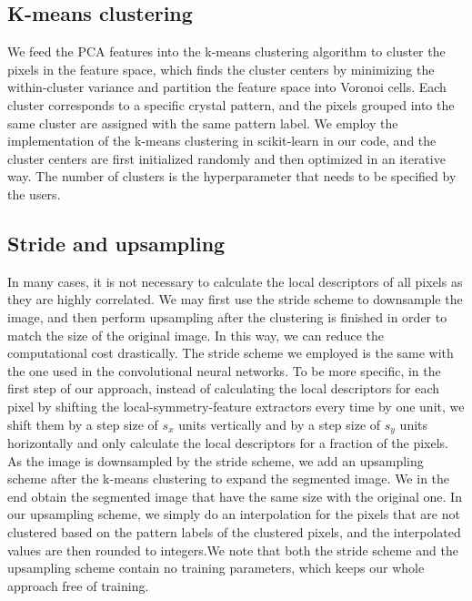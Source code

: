 \documentclass[twocolumn,amsmath, floatfix]{revtex4}
\begin{document}
\subsection{K-means clustering}
We feed the PCA features into the k-means clustering algorithm \cite{kmeans1967, kmeans2007} to cluster the pixels in the feature space, which finds the cluster centers by minimizing the within-cluster variance and partition the feature space into Voronoi cells.  Each cluster corresponds to a specific crystal pattern, and the pixels grouped into the same cluster are assigned with the same pattern label.  We employ the implementation of the k-means clustering in scikit-learn \cite{scikit-learn} in our code, and the cluster centers are first initialized randomly and then optimized in an iterative way. The number of clusters is the hyperparameter that needs to be specified by the users. 

\subsection{Stride and upsampling}
In many cases, it is not necessary to calculate the local descriptors of all pixels as they are highly correlated. We may first use the stride scheme to downsample the image, and then perform upsampling after the clustering is finished in order to match the size of the original image. In this way, we can reduce the computational cost drastically.  The stride scheme we employed is the same with the one used in the convolutional neural networks. To be more specific,  in the first step of our approach,
instead of calculating the local descriptors for each pixel by shifting the local-symmetry-feature extractors every time by one unit, we shift them by a step size of $s_x$ units vertically and by a step size of $s_y$ units horizontally and only calculate the local descriptors for a fraction of the pixels. As the image is downsampled by the stride scheme, we add an upsampling scheme after the k-means clustering to expand the segmented image. We in the end obtain the segmented image that have the same size with the original one. In our upsampling scheme, we simply do an interpolation for the pixels that are not clustered based on the pattern labels of the clustered pixels, and the interpolated values are then rounded to integers.We note that both the stride scheme and the upsampling scheme contain no training parameters, which keeps our whole approach free of training.  
\end{document}
